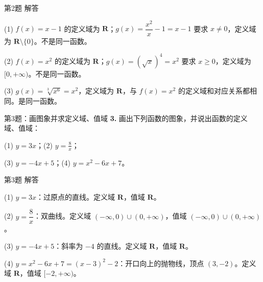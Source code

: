 \documentclass[10pt,aspectratio=169,serif]{beamer}
\begin{document}
\begin{frame}[t]{第2题 解答}
\begin{tcolorbox}[colback=orange!10,colframe=orange,title=\textbf{解}]
(1) $f(x)=x-1$ 的定义域为 $\mathbf{R}$；$g(x)=\dfrac{x^2}{x}-1=x-1$ 要求 $x\neq 0$，定义域为 $\mathbf{R}\setminus\{0\}$。\alert{不是}同一函数。

\vspace{1em}
(2) $f(x)=x^2$ 的定义域为 $\mathbf{R}$；$g(x)=(\sqrt{x})^4=x^2$ 要求 $x\ge 0$，定义域为 $[0,+\infty)$。\alert{不是}同一函数。

\vspace{1em}
(3) $g(x)=\sqrt[3]{x^6}=x^2$，定义域为 $\mathbf{R}$，与 $f(x)=x^2$ 的定义域和对应关系都相同。\alert{是}同一函数。
\end{tcolorbox}
\end{frame}

\begin{frame}[t]{第3题：画图象并求定义域、值域}
\textbf{3.} 画出下列函数的图象，并说出函数的定义域、值域：

\vspace{0.8em}
(1) $y=3x$；\hfil (2) $\displaystyle y=\frac{8}{x}$；

\vspace{0.8em}
(3) $y=-4x+5$；\hfil (4) $y=x^2-6x+7$。
\end{frame}

\begin{frame}[t]{第3题 解答}
\begin{tcolorbox}[colback=orange!10,colframe=orange,title=\textbf{解}]
(1) $y=3x$：过原点的直线。定义域 $\mathbf{R}$，值域 $\mathbf{R}$。

\vspace{1em}
(2) $y=\dfrac{8}{x}$：双曲线。定义域 $(-\infty,0)\cup(0,+\infty)$，值域 $(-\infty,0)\cup(0,+\infty)$。

\vspace{1em}
(3) $y=-4x+5$：斜率为 $-4$ 的直线。定义域 $\mathbf{R}$，值域 $\mathbf{R}$。

\vspace{1em}
(4) $y=x^2-6x+7=(x-3)^2-2$：开口向上的抛物线，顶点 $(3,-2)$。定义域 $\mathbf{R}$，值域 $[-2,+\infty)$。
\end{tcolorbox}
\end{frame}
\end{document}
